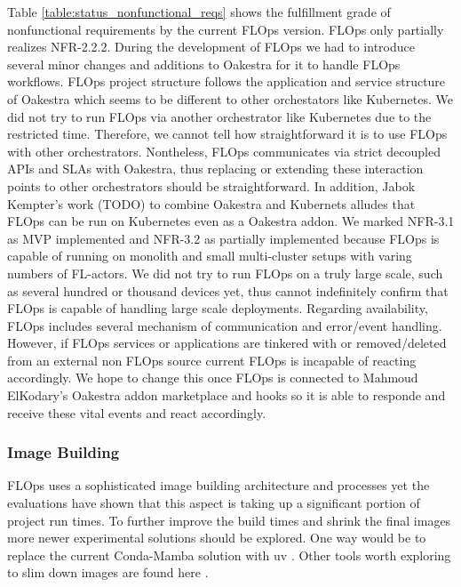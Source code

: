 

Table \ref{table:status_nonfunctional_reqs} shows the fulfillment grade of nonfunctional requirements by the current FLOps version.
FLOps only partially realizes NFR-2.2.2.
During the development of FLOps we had to introduce several minor changes and additions to Oakestra for it to handle FLOps workflows.
FLOps project structure follows the application and service structure of Oakestra which seems to be different to other orchestators like Kubernetes.
We did not try to run FLOps via another orchestrator like Kubernetes due to the restricted time.
Therefore, we cannot tell how straightforward it is to use FLOps with other orchestrators.
Nontheless, FLOps communicates via strict decoupled APIs and SLAs with Oakestra, thus replacing or extending these interaction points to other orchestrators should be straightforward.
In addition, Jabok Kempter's work (TODO) to combine Oakestra and Kubernets alludes that FLOps can be run on Kubernetes even as a Oakestra addon.
We marked NFR-3.1 as MVP implemented and NFR-3.2 as partially implemented because FLOps is capable of running on monolith and small multi-cluster setups with varing numbers of FL-actors.
We did not try to run FLOps on a truly large scale, such as several hundred or thousand devices yet, thus cannot indefinitely confirm that FLOps is capable of handling large scale deployments.
Regarding availability, FLOps includes several mechanism of communication and error/event handling.
However, if FLOps services or applications are tinkered with or removed/deleted from an external non FLOps source current FLOps is incapable of reacting accordingly.
We hope to change this once FLOps is connected to Mahmoud ElKodary's Oakestra addon marketplace and hooks so it is able to responde and receive these vital events and react accordingly.

\subsubsection{Image Building}
FLOps uses a sophisticated image building architecture and processes yet the evaluations have shown that this aspect is taking up a significant portion of project run times.
To further improve the build times and shrink the final images more newer experimental solutions should be explored.
One way would be to replace the current Conda-Mamba solution with uv \cite{uv}.
Other tools worth exploring to slim down images are found here \cite{slim,dragonfly,nydus}.

